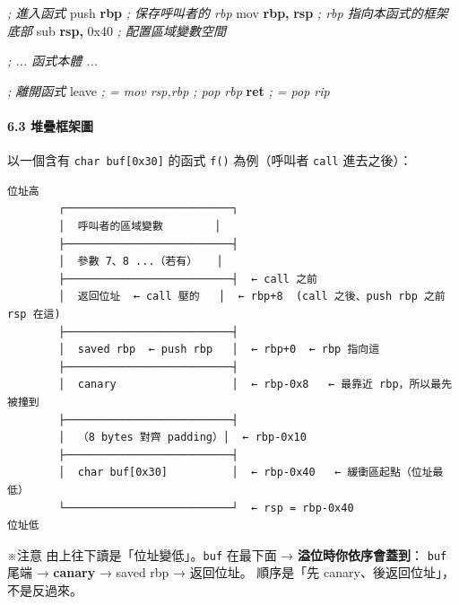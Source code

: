\documentclass[10pt,a4paper]{article}
\newenvironment{Shaded}{\begin{snugshade}}{\end{snugshade}}
\newcommand{\BaseNTok}[1]{\textcolor[rgb]{0.00,0.00,0.81}{#1}}
\newcommand{\BuiltInTok}[1]{#1}
\newcommand{\CommentTok}[1]{\textcolor[rgb]{0.56,0.35,0.01}{\textit{#1}}}
\newcommand{\ControlFlowTok}[1]{\textcolor[rgb]{0.13,0.29,0.53}{\textbf{#1}}}
\newcommand{\KeywordTok}[1]{\textcolor[rgb]{0.13,0.29,0.53}{\textbf{#1}}}
\newcommand{\OperatorTok}[1]{\textcolor[rgb]{0.81,0.36,0.00}{\textbf{#1}}}
\renewenvironment{Shaded}{%
  \def\FrameCommand{\fboxsep=3.2pt\colorbox{shadecolor}}%
  \MakeFramed{\advance\hsize-\width\FrameRestore\small}%
}{%
  \endMakeFramed
}
\renewenvironment{quote}{%
  \begin{mdframed}[linewidth=0pt,innerleftmargin=0pt,innerrightmargin=0pt,
    innerbottommargin=0pt,innertopmargin=0pt,skipabove=0.55em,skipbelow=0.55em,
    leftmargin=0.9em,rightmargin=0.4em,startcode={\color{quotebar}\vrule width 2.6pt},%
    endcode={}]%
  \itshape\color{black}%
}{%
  \end{mdframed}%
}
\begin{document}
\begin{Shaded}
\begin{Highlighting}[]
\CommentTok{; 進入函式}
\BuiltInTok{push} \KeywordTok{rbp}              \CommentTok{; 保存呼叫者的 rbp}
\BuiltInTok{mov}  \KeywordTok{rbp}\OperatorTok{,} \KeywordTok{rsp}         \CommentTok{; rbp 指向本函式的框架底部}
\BuiltInTok{sub}  \KeywordTok{rsp}\OperatorTok{,} \BaseNTok{0x40}        \CommentTok{; 配置區域變數空間}

\CommentTok{; ... 函式本體 ...}

\CommentTok{; 離開函式}
\BuiltInTok{leave}                 \CommentTok{; = mov rsp,rbp ; pop rbp}
\ControlFlowTok{ret}                   \CommentTok{; = pop rip}
\end{Highlighting}
\end{Shaded}

\paragraph{6.3 堆疊框架圖}\label{ux5806ux758aux6846ux67b6ux5716}

以一個含有 \texttt{char\ \allowbreak{}buf{[}0x30{]}} 的函式 \texttt{f()} 為例（呼叫者
\texttt{call} 進去之後）：

\begin{Verbatim}[breaklines=true,breakanywhere=true,breakautoindent=false,fontsize=\fontsize{7.0}{9.5}\selectfont]
位址高
        ┌──────────────────────────┐
        │  呼叫者的區域變數        │
        ├──────────────────────────┤
        │  參數 7、8 ...（若有）   │
        ├──────────────────────────┤  ← call 之前
        │  返回位址  ← call 壓的   │  ← rbp+8  (call 之後、push rbp 之前 rsp 在這)
        ├──────────────────────────┤
        │  saved rbp  ← push rbp   │  ← rbp+0  ← rbp 指向這
        ├──────────────────────────┤
        │  canary                  │  ← rbp-0x8   ← 最靠近 rbp，所以最先被撞到
        ├──────────────────────────┤
        │  （8 bytes 對齊 padding）│  ← rbp-0x10
        ├──────────────────────────┤
        │  char buf[0x30]          │  ← rbp-0x40   ← 緩衝區起點（位址最低）
        └──────────────────────────┘  ← rsp = rbp-0x40
位址低
\end{Verbatim}

\begin{quote}
※注意 由上往下讀是「位址變低」。\texttt{buf} 在最下面 →
\textbf{溢位時你依序會蓋到}： \texttt{buf} 尾端 → \textbf{canary} →
saved rbp → 返回位址。 順序是「先 canary、後返回位址」，不是反過來。
\end{quote}
\end{document}
